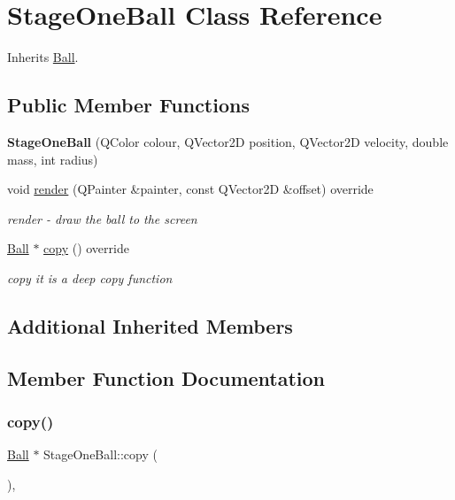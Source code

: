 \hypertarget{class_stage_one_ball}{}\section{Stage\+One\+Ball Class Reference}
\label{class_stage_one_ball}


Inherits \mbox{\hyperlink{class_ball}{Ball}}.

\subsection*{Public Member Functions}
\begin{DoxyCompactItemize}
\item 
\mbox{\label{class_stage_one_ball_a70fd661f3b92f3e4745d4963b9b3ec80}} 
{\bfseries Stage\+One\+Ball} (Q\+Color colour, Q\+Vector2D position, Q\+Vector2D velocity, double mass, int radius)
\item 
void \mbox{\hyperlink{class_stage_one_ball_aa4f7f52cb8946b59c201d724dc0dc5bd}{render}} (Q\+Painter \&painter, const Q\+Vector2D \&offset) override
\begin{DoxyCompactList}\small\item\em render -\/ draw the ball to the screen \end{DoxyCompactList}\item 
\mbox{\hyperlink{class_ball}{Ball}} $\ast$ \mbox{\hyperlink{class_stage_one_ball_a8c75b7d3f7e84bc95cbdce60f030787e}{copy}} () override
\begin{DoxyCompactList}\small\item\em copy it is a deep copy function \end{DoxyCompactList}\end{DoxyCompactItemize}
\subsection*{Additional Inherited Members}


\subsection{Member Function Documentation}
\mbox{\label{class_stage_one_ball_a8c75b7d3f7e84bc95cbdce60f030787e}} 
\subsubsection{\texorpdfstring{copy()}{copy()}}
{\footnotesize\ttfamily \mbox{\hyperlink{class_ball}{Ball}} $\ast$ Stage\+One\+Ball\+::copy (\begin{DoxyParamCaption}{ }\end{DoxyParamCaption})\hspace{0.3cm}{\ttfamily [override]}, {\ttfamily [virtual]}}



